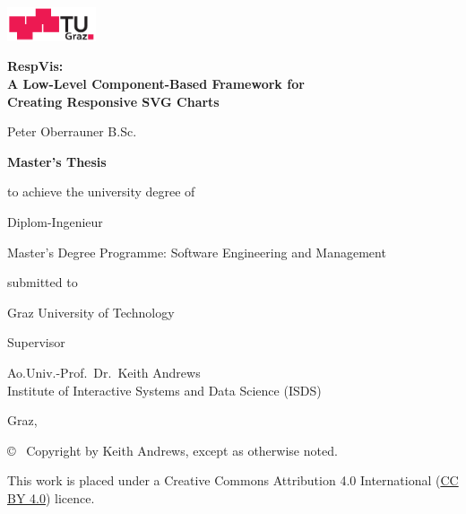 \begin{center}
\includegraphics[height=1cm]{diagrams/tugraz-logo.pdf}

\vspace{2cm}

\begin{spacing}{1.1}
\huge\sffamily\bfseries
RespVis:\\ 
A Low-Level Component-Based Framework for\\
Creating Responsive SVG Charts
\end{spacing}

\vspace{2cm}

{\Large\sffamily Peter Oberrauner B.Sc.}

\vspace{2cm}

{\Large\sffamily\bfseries Master's Thesis}

\vspace{5mm}

{\small\sffamily to achieve the university degree of}

\vspace{5mm}

{\normalsize\sffamily Diplom-Ingenieur}  %

\vspace{5mm}

{\normalsize\sffamily
Master's Degree Programme: Software Engineering and Management
}


\vspace{1cm}

{\small\sffamily submitted to}

\vspace{5mm}

{\large\sffamily Graz University of Technology}



\vspace{1cm}

{\small\sffamily Supervisor}

\vspace{5mm}

{\normalsize\sffamily
Ao.Univ.-Prof.\ Dr.\ Keith Andrews \\
Institute of Interactive Systems and Data Science (ISDS)
}


\vspace{1cm}

{\normalsize\sffamily Graz, \thisdate}



\vfill

{\footnotesize\sffamily \copyright ~ Copyright \thisyear by Keith Andrews,
except as otherwise noted.}

{\footnotesize\sffamily This work is placed under a
Creative Commons Attribution 4.0 International
(\href{https://creativecommons.org/licenses/by/4.0/}{CC BY 4.0}) licence.}


\end{center}




